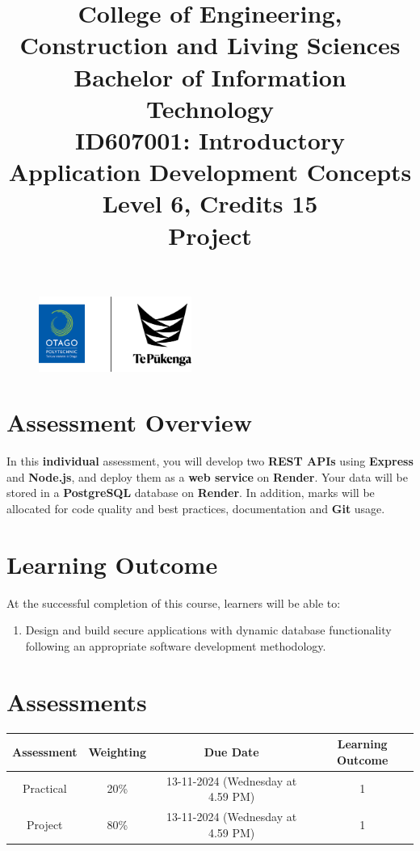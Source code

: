 \documentclass{article}
\author{}
\begin{document}
\begin{figure}
	\centering
	\includegraphics[width=50mm]{../img/logo.png}
\end{figure}

\title{College of Engineering, Construction and Living Sciences\\Bachelor of Information Technology\\ID607001: Introductory Application Development Concepts\\Level 6, Credits 15\\\textbf{Project}}
\date{}
\maketitle 

\section*{Assessment Overview}
In this \textbf{individual} assessment, you will develop two \textbf{REST APIs} using \textbf{Express} and \textbf{Node.js}, and deploy them as a \textbf{web service} on \textbf{Render}. Your data will be stored in a \textbf{PostgreSQL} database on \textbf{Render}. In addition, marks will be allocated for code quality and best practices, documentation and \textbf{Git} usage. 

\section*{Learning Outcome}
At the successful completion of this course, learners will be able to:
\begin{enumerate}
	\item Design and build secure applications with dynamic database functionality following an appropriate software development methodology.
\end{enumerate}

\section*{Assessments}
\renewcommand{\arraystretch}{1.5}
\begin{tabular}{|c|c|c|c|}
	\hline
	\textbf{Assessment}                                 & \textbf{Weighting} & \textbf{Due Date}            & \textbf{Learning Outcome} \\ \hline
	\small Practical & \small 20\%        & \small 13-11-2024 (Wednesday at 4.59 PM)   & \small 1                   \\ \hline
	\small Project                 & \small 80\%        & \small 13-11-2024 (Wednesday at 4.59 PM) \small  & \small 1                   \\ \hline
\end{tabular}
\end{document}
